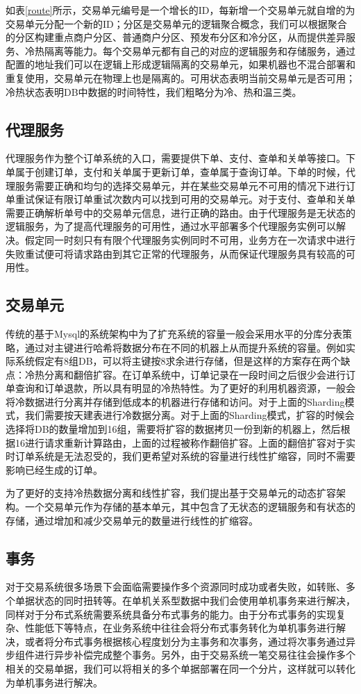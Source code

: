\documentclass[letterpaper,twocolumn,10pt]{article}
\begin{document}
如表\ref{route}所示，交易单元编号是一个增长的ID，每新增一个交易单元就自增的为交易单元分配一个新的ID；分区是交易单元的逻辑聚合概念，我们可以根据聚合的分区构建重点商户分区、普通商户分区、预发布分区和冷分区，从而提供差异服务、冷热隔离等能力。每个交易单元都有自己的对应的逻辑服务和存储服务，通过配置的地址我们可以在逻辑上形成逻辑隔离的交易单元，如果机器也不混合部署和重复使用，交易单元在物理上也是隔离的。可用状态表明当前交易单元是否可用；冷热状态表明DB中数据的时间特性，我们粗略分为冷、热和温三类。

\subsection{代理服务}
代理服务作为整个订单系统的入口，需要提供下单、支付、查单和关单等接口。下单属于创建订单，支付和关单属于更新订单，查单属于查询订单。下单的时候，代理服务需要正确和均匀的选择交易单元，并在某些交易单元不可用的情况下进行订单重试保证有限订单重试次数内可以找到可用的交易单元。对于支付、查单和关单需要正确解析单号中的交易单元信息，进行正确的路由。由于代理服务是无状态的逻辑服务，为了提高代理服务的可用性，通过水平部署多个代理服务实例可以解决。假定同一时刻只有有限个代理服务实例同时不可用，业务方在一次请求中进行失败重试便可将请求路由到其它正常的代理服务，从而保证代理服务具有较高的可用性。

\subsection{交易单元}
传统的基于Mysql的系统架构中为了扩充系统的容量一般会采用水平的分库分表策略，通过对主键进行哈希将数据分布在不同的机器上从而提升系统的容量。例如实际系统假定有8组DB，可以将主键按8求余进行存储，但是这样的方案存在两个缺点：冷热分离和翻倍扩容。在订单系统中，订单记录在一段时间之后很少会进行订单查询和订单退款，所以具有明显的冷热特性。为了更好的利用机器资源，一般会将冷数据进行分离并存储到低成本的机器进行存储和访问。对于上面的Sharding模式，我们需要按天建表进行冷数据分离。对于上面的Sharding模式，扩容的时候会选择将DB的数量增加到16组，需要将扩容的数据拷贝一份到新的机器上，然后根据16进行请求重新计算路由，上面的过程被称作翻倍扩容。上面的翻倍扩容对于实时订单系统是无法忍受的，我们更希望对系统的容量进行线性扩缩容，同时不需要影响已经生成的订单。

为了更好的支持冷热数据分离和线性扩容，我们提出基于交易单元的动态扩容架构。一个交易单元作为存储的基本单元，其中包含了无状态的逻辑服务和有状态的存储，通过增加和减少交易单元的数量进行线性的扩缩容。

\subsection{事务}
对于交易系统很多场景下会面临需要操作多个资源同时成功或者失败，如转账、多个单据状态的同时扭转等。在单机关系型数据中我们会使用单机事务来进行解决，同样对于分布式系统需要系统具备分布式事务的能力。由于分布式事务的实现复杂、性能低下等特点，在业务系统中往往会将分布式事务转化为单机事务进行解决，或者将分布式事务根据核心程度划分为主事务和次事务，通过将次事务通过异步组件进行异步补偿完成整个事务。另外，由于交易系统一笔交易往往会操作多个相关的交易单据，我们可以将相关的多个单据部署在同一个分片，这样就可以转化为单机事务进行解决。
\end{document}
